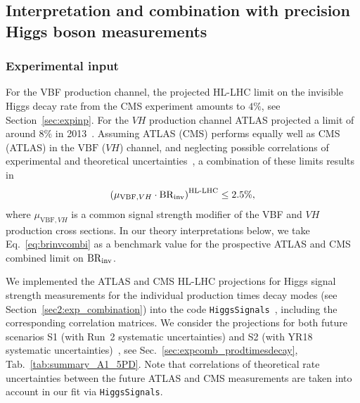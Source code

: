 \documentclass[../report.tex]{subfiles}
\begin{document}
\subsection{Interpretation and combination with precision Higgs boson measurements}
\subsubsection{Experimental input}
\label{sec6:exp}
{For the VBF production channel, the projected HL-LHC limit on the invisible Higgs decay rate from the CMS experiment amounts to $4\%$, see Section~\ref{sec:expinp}. For the $VH$ production channel ATLAS projected a limit of around $8\%$ in 2013}~\cite{ATL-PHYS-PUB-2013-014}.
Assuming ATLAS (CMS) performs equally well as CMS (ATLAS) in the $\text{VBF}$ ($VH$) channel, and neglecting possible correlations of experimental and theoretical uncertainties~\cite{CMS-PAS-JME-15-001}, a combination of these limits results in
\begin{align}\label{eq:brinvcombi}
\left(\mu_{\text{VBF},VH} \cdot \BRHinv \right)^\text{HL-LHC} \le 2.5\%,
\end{align}
where $\mu_{\text{VBF},VH}$ is a common signal strength modifier of the VBF and $VH$ production cross sections. In our theory interpretations below, we take Eq.~\eqref{eq:brinvcombi} as a benchmark value for the prospective ATLAS and CMS combined limit on $\mathrm{BR}_\mathrm{inv}$.


We implemented the ATLAS and CMS HL-LHC projections for Higgs signal strength measurements for the individual production times decay modes (see Section~\ref{sec2:exp_combination}) into the code \texttt{Higgs\-Signals}~\cite{Bechtle:2013xfa,Bechtle:2014ewa}, including the corresponding correlation matrices.
We consider the projections for both future scenarios S1 (with Run~2 systematic uncertainties) and S2 (with YR18 systematic uncertainties)~\cite{HLHELHCCommonSystematics}, see Sec.~\ref{sec:expcomb_prodtimesdecay}, Tab.~\ref{tab:summary_A1_5PD}.
Note that correlations of theoretical rate uncertainties between the future ATLAS and CMS measurements are taken into account in our fit via \texttt{HiggsSignals}. 
\end{document}

